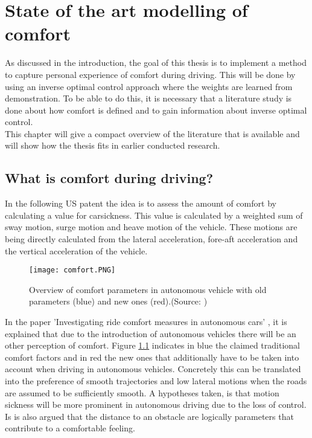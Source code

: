 \chapter{State of the art modelling of comfort}
\label{cha:Literature_study}
As discussed in the introduction, the goal of this thesis is to implement a method to capture personal experience of comfort during driving. This will be done by using an inverse optimal control approach where the weights are learned from demonstration. To be able to do this, it is necessary that a literature study is done about how comfort is defined and to gain information about inverse optimal control.\\
This chapter will give a compact overview of the literature that is available and will show how the thesis fits in earlier conducted research.

\section{What is comfort during driving?}
\label{s:comfort_parameters}
In the following US patent \cite{Daniel2018} the idea is to assess the amount of comfort by calculating a value for carsickness. This value is calculated by a weighted sum of sway motion, surge motion and heave motion of the vehicle. These motions are being directly calculated from the lateral acceleration, fore-aft acceleration and the vertical acceleration of the vehicle. \\

\begin{figure}[h!]
	\centering
	\texttt{[image: comfort.PNG]}
	\caption{Overview of comfort parameters in autonomous vehicle with old parameters (blue) and new ones (red).(Source: \cite{Elbanhawi2015})}
	\label{fig:Comfort}
\end{figure} 

In the paper 'Investigating ride comfort measures in autonomous cars' \cite{Elbanhawi2015}, it is explained that due to the introduction of autonomous vehicles there will be an other perception of comfort. Figure \ref{fig:Comfort} indicates in blue the claimed traditional comfort factors and in red the new ones that additionally have to be taken into account when driving in autonomous vehicles. Concretely this can be translated into the preference of smooth trajectories and low lateral motions when the roads are assumed to be sufficiently smooth. A hypotheses taken, is that motion sickness will be more prominent in autonomous driving due to the loss of control. Is is also argued that the distance to an obstacle are logically parameters that contribute to a comfortable feeling.\\

